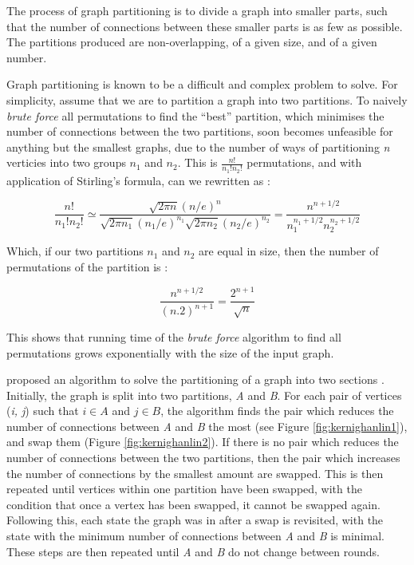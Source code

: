The process of graph partitioning is to divide a graph into smaller parts, such that the number of connections between these smaller parts is as few as possible. The partitions produced are non-overlapping, of a given size, and of a given number.

Graph partitioning is known to be a difficult and complex problem to solve. For simplicity, assume that we are to partition a graph into two partitions. To naively \emph{brute force} all permutations to find the ``best'' partition, which minimises the number of connections between the two partitions, soon becomes unfeasible for anything but the smallest graphs, due to the number of ways of partitioning \emph{n} verticies into two groups \emph{$n_1$} and \emph{$n_2$}. This is $\frac{n!}{n_1!n_2!}$ permutations, and with application of Stirling's formula, can we rewritten as \cite{newman10}:

\begin{equation}
\frac{n!}{n_1!n_2!} \simeq \frac{\sqrt{2\pi n}(n/e)^n}{\sqrt{2\pi n_1}(n_1/e)^{n_1} \sqrt{2\pi n_2}(n_2/e)^{n_2}} = \frac{n^{n+1/2}}{n_1^{n_1+1/2} n_2^{n_2+1/2}} 
\label{eq:partioning1}
\end{equation}

Which, if our two partitions $n_1$ and $n_2$ are equal in size, then the number of permutations of the partition is \cite{newman10}:

\begin{equation}
\frac{n^{n+1/2}}{(n.2)^{n+1}} = \frac{2^{n+1}}{\sqrt{n}}
\label{eq:}
\end{equation}

This shows that running time of the \emph{brute force} algorithm to find all permutations grows exponentially with the size of the input graph.

\citeauthor{kernighan70} proposed an algorithm to solve the partitioning of a graph into two sections \cite{kernighan70}. Initially, the graph is split into two partitions, \emph{A} and \emph{B}. For each pair of vertices (\emph{i, j}) such that $i \in A$ and $j \in B$, the algorithm finds the pair which reduces the number of connections between \emph{A} and \emph{B} the most (see Figure \ref{fig:kernighanlin1}), and swap them (Figure \ref{fig:kernighanlin2}). If there is no pair which reduces the number of connections between the two partitions, then the pair which increases the number of connections by the smallest amount are swapped. This is then repeated until vertices within one partition have been swapped, with the condition that once a vertex has been swapped, it cannot be swapped again. Following this, each state the graph was in after a swap is revisited, with the state with the minimum number of connections between \emph{A} and \emph{B} is minimal. These steps are then repeated until \emph{A} and \emph{B} do not change between rounds.

